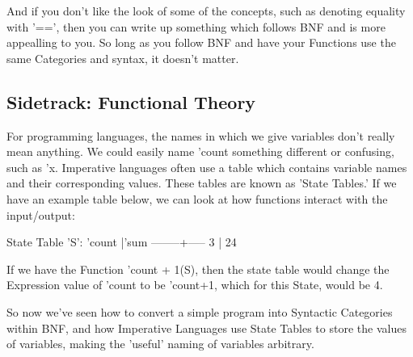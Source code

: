 \documentclass[12pt]{article}
\begin{document}
And if you don't like the look of some of the concepts, such as denoting
equality with '==', then you can write up something which follows BNF and is
more appealling to you.  So long as you follow BNF and have your Functions
use the same Categories and syntax, it doesn't matter.

\subsection{Sidetrack: Functional Theory}
\label{sec-3-8}
For programming languages, the names in which we give variables don't really
mean anything.  We could easily name 'count something different or confusing,
such as 'x.  Imperative languages often use a table which contains variable
names and their corresponding values.  These tables are known as 'State
Tables.'  If we have an example table below, we can look at how functions
interact with the input/output:

State Table 'S':
'count  |'sum
--------+-----
   3    | 24


If we have the Function
\textlbrackdbl'count + 1\textrbrackdbl           (S), then the state table would change the
           Expression
value of 'count to be 'count+1, which for this State, would be 4.

So now we've seen how to convert a simple program into Syntactic Categories
within BNF, and how Imperative Languages use State Tables to store the values
of variables, making the 'useful' naming of variables arbitrary.
\end{document}
